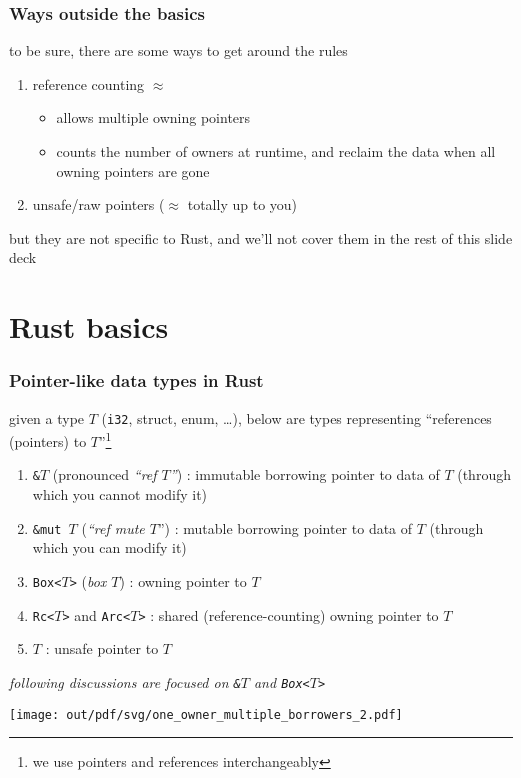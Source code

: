 \documentclass[12pt,dvipdfmx]{beamer}
\newcommand{\mura}[1]{{\color{purple}#1}}
\newcommand{\ore}[1]{{\color{orange}#1}}
\newcommand{\ao}[1]{{\color{blue}#1}}
\begin{document}
\begin{frame}
  \frametitle{Ways outside the basics}
  to be sure, there are some ways to get around the rules
  \begin{enumerate}
  \item \ao{reference counting} $\approx$
    \begin{itemize}
    \item allows multiple owning pointers
    \item counts the number of owners at runtime, and reclaim the data when all
      owning pointers are gone
    \end{itemize}
  \item \ao{unsafe/raw pointers} ($\approx$ totally up to you)
  \end{enumerate}
  but they are not specific to Rust,
  and we'll not cover them in the rest of this slide deck
\end{frame}

\section{Rust basics}
\begin{frame}
  \frametitle{Pointer-like data types in Rust}
  given a type $T$ ({\tt i32}, struct, enum, \ldots), below are
  types representing ``references (pointers) to $T$''\footnote{we use
    pointers and references interchangeably}
  \begin{enumerate}
  \item \ao{\tt \&$T$} (pronounced {\it ``ref $T$''}) : 
    \ao{immutable borrowing pointer} to data of $T$ (through which you cannot modify it)
  \item \ao{\tt \&mut $T$} ({\it ``ref mute $T$}'') : 
    \ao{mutable borrowing pointer} to data of $T$ (through which you can modify it)
  \item \mura{\tt Box<$T$>} ({\it box $T$}) : 
    \mura{owning} pointer to $T$
  \item \ore{\tt Rc<$T$>} and \ore{\tt Arc<$T$>} : 
    shared (reference-counting) owning pointer to $T$
  \item \ore{\tt *$T$} : unsafe pointer to $T$
  \end{enumerate}

  {\it following discussions are focused on \ao{\tt \&$T$}
    and \mura{\tt Box<$T$>}}

  \begin{center}
    \texttt{[image: out/pdf/svg/one\_owner\_multiple\_borrowers\_2.pdf]}
  \end{center}
\end{frame}
\end{document}
